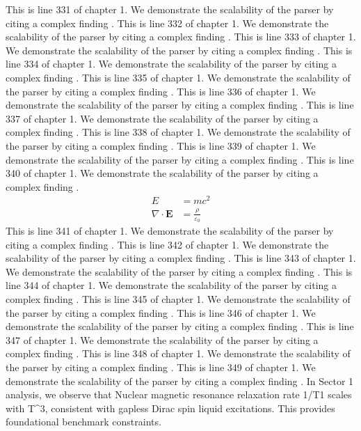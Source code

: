 This is line 331 of chapter 1. We demonstrate the scalability of the parser by citing a complex finding \cite{ref1_331}.
This is line 332 of chapter 1. We demonstrate the scalability of the parser by citing a complex finding \cite{ref1_332}.
This is line 333 of chapter 1. We demonstrate the scalability of the parser by citing a complex finding \cite{ref1_333}.
This is line 334 of chapter 1. We demonstrate the scalability of the parser by citing a complex finding \cite{ref1_334}.
This is line 335 of chapter 1. We demonstrate the scalability of the parser by citing a complex finding \cite{ref1_335}.
This is line 336 of chapter 1. We demonstrate the scalability of the parser by citing a complex finding \cite{ref1_336}.
This is line 337 of chapter 1. We demonstrate the scalability of the parser by citing a complex finding \cite{ref1_337}.
This is line 338 of chapter 1. We demonstrate the scalability of the parser by citing a complex finding \cite{ref1_338}.
This is line 339 of chapter 1. We demonstrate the scalability of the parser by citing a complex finding \cite{ref1_339}.
This is line 340 of chapter 1. We demonstrate the scalability of the parser by citing a complex finding \cite{ref1_340}.
\begin{align*}
  E &= mc^2 \\
  \nabla \cdot \mathbf{E} &= \frac{\rho}{\varepsilon_0}
\end{align*}
This is line 341 of chapter 1. We demonstrate the scalability of the parser by citing a complex finding \cite{ref1_341}.
This is line 342 of chapter 1. We demonstrate the scalability of the parser by citing a complex finding \cite{ref1_342}.
This is line 343 of chapter 1. We demonstrate the scalability of the parser by citing a complex finding \cite{ref1_343}.
This is line 344 of chapter 1. We demonstrate the scalability of the parser by citing a complex finding \cite{ref1_344}.
This is line 345 of chapter 1. We demonstrate the scalability of the parser by citing a complex finding \cite{ref1_345}.
This is line 346 of chapter 1. We demonstrate the scalability of the parser by citing a complex finding \cite{ref1_346}.
This is line 347 of chapter 1. We demonstrate the scalability of the parser by citing a complex finding \cite{ref1_347}.
This is line 348 of chapter 1. We demonstrate the scalability of the parser by citing a complex finding \cite{ref1_348}.
This is line 349 of chapter 1. We demonstrate the scalability of the parser by citing a complex finding \cite{ref1_349}.
In Sector 1 analysis, we observe that Nuclear magnetic resonance relaxation rate 1/T1 scales with T^3, consistent with gapless Dirac spin liquid excitations. This provides foundational benchmark constraints.
